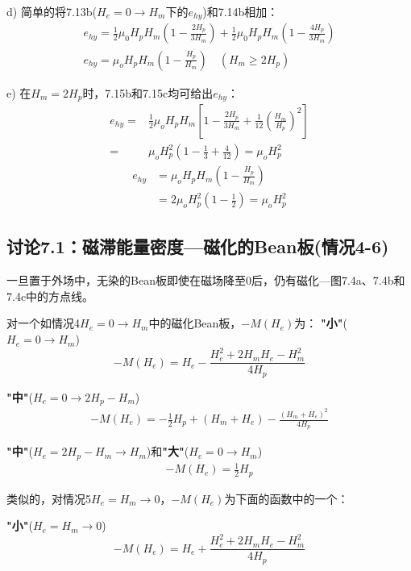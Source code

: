 d) 简单的将7.13b($H_e=0\rightarrow H_m$下的$e_{hy}$)和7.14b相加：
\begin{align*}%
e_{hy}=\frac{1}{2}\mu_0 H_p H_m\left(1-\frac{2H_p}{3H_m}\right)+\frac{1}{2}\mu_0 H_p H_m\left(1-\frac{4H_p}{3H_m}\right)\\
e_{hy}=\mu_oH_pH_m\left(1-\frac{H_p}{H_m}\right) \quad   (H_m\geq 2H_p) \tag{7.15c}
\end{align*}

e) 在$H_m=2H_p$时，7.15b和7.15c均可给出$e_{hy}$：
\begin{align*}%
e_{hy}=&\frac{1}{2}\mu_oH_pH_m\left[1-\frac{2H_p}{3H_m}+\frac{1}{12}\left(\frac{H_m}{H_p}\right)^2\right]\\\tag{7.15b}
=&\mu_oH_{p}^{2}\left(1-\frac{1}{3}+\frac{4}{12}\right)=\mu_oH_{p}^{2}
\end{align*}
\begin{align*}%
e_{hy}&=\mu_oH_pH_m\left(1-\frac{H_p}{H_m}\right) \\\tag{7.15c}
&=2\mu_oH_{p}^{2}\left(1-\frac{1}{2}\right)=\mu_oH_{p}^{2}
\end{align*}

\subsection{讨论7.1：磁滞能量密度---磁化的Bean板(情况4-6)}
一旦置于外场中，无染的Bean板即使在磁场降至0后，仍有磁化---图7.4a、7.4b和7.4c中的方点线。

对一个如情况4$H_e=0\rightarrow H_m$中的磁化Bean板，$-M(H_e)$为：
\textbf{"小"}($H_e=0\rightarrow H_m$)
\begin{equation}%
-M(H_e)=H_e-\frac{H_{e}^{2}+2H_mH_e-H_{m}^{2}}{4H_p}
\end{equation}

\textbf{"中"}($H_e=0\rightarrow 2H_p-H_m$)
\begin{align*}%
-M(H_e)=-\frac{1}{2}H_p+(H_m+H_e)-\frac{(H_m+H_e)^2}{4H_p} \tag{7.17b}
\end{align*}

\textbf{"中"}($H_e=2H_p-H_m\rightarrow H_m$)和\textbf{"大"}($H_e=0\rightarrow H_m$)
\begin{align*}%
-M(H_e)=\frac{1}{2}H_p \tag{5.6}
\end{align*}

类似的，对情况5$H_e=H_m\rightarrow 0$，$-M(H_e)$为下面的函数中的一个：

\textbf{"小"}($H_e=H_m\rightarrow 0$)
\begin{equation}%
-M(H_e)=H_e+\frac{H_{e}^{2}+2H_mH_e-H_{m}^{2}}{4H_p}
\end{equation}

